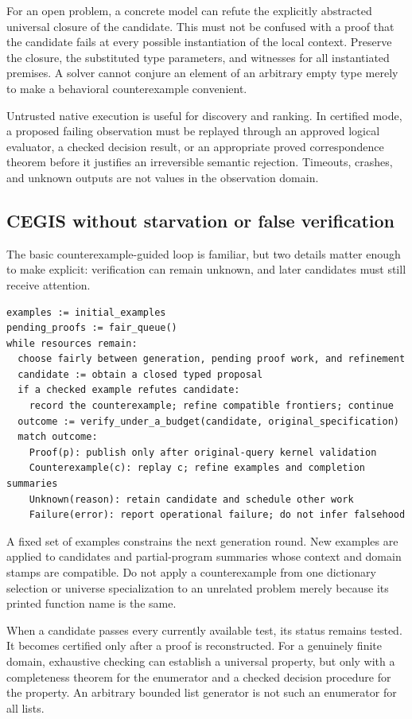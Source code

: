 For an open problem, a concrete model can refute the explicitly abstracted universal closure of the candidate. This must not be confused with a proof that the candidate fails at every possible instantiation of the local context. Preserve the closure, the substituted type parameters, and witnesses for all instantiated premises. A solver cannot conjure an element of an arbitrary empty type merely to make a behavioral counterexample convenient.

Untrusted native execution is useful for discovery and ranking. In certified mode, a proposed failing observation must be replayed through an approved logical evaluator, a checked decision result, or an appropriate proved correspondence theorem before it justifies an irreversible semantic rejection. Timeouts, crashes, and unknown outputs are not values in the observation domain.

\subsection{CEGIS without starvation or false verification}
The basic counterexample-guided loop is familiar, but two details matter enough to make explicit: verification can remain unknown, and later candidates must still receive attention.
\begin{lstlisting}[language={},caption={Proposed certificate-aware CEGIS coordinator.}]
examples := initial_examples
pending_proofs := fair_queue()
while resources remain:
  choose fairly between generation, pending proof work, and refinement
  candidate := obtain a closed typed proposal
  if a checked example refutes candidate:
    record the counterexample; refine compatible frontiers; continue
  outcome := verify_under_a_budget(candidate, original_specification)
  match outcome:
    Proof(p): publish only after original-query kernel validation
    Counterexample(c): replay c; refine examples and completion summaries
    Unknown(reason): retain candidate and schedule other work
    Failure(error): report operational failure; do not infer falsehood
\end{lstlisting}
A fixed set of examples constrains the next generation round. New examples are applied to candidates and partial-program summaries whose context and domain stamps are compatible. Do not apply a counterexample from one dictionary selection or universe specialization to an unrelated problem merely because its printed function name is the same.

When a candidate passes every currently available test, its status remains tested. It becomes certified only after a proof is reconstructed. For a genuinely finite domain, exhaustive checking can establish a universal property, but only with a completeness theorem for the enumerator and a checked decision procedure for the property. An arbitrary bounded list generator is not such an enumerator for all lists.

